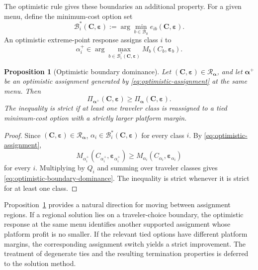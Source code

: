 \documentclass{article}
\newtheorem{proposition}{Proposition}
\begin{document}
The optimistic rule gives these boundaries an additional property.
For a given menu, define the minimum-cost option set
\begin{equation}
    \mathcal B_i^*(\bm C,\bm\varepsilon)
    :=
    \arg\min_{b\in\mathcal B_0}
    e_{ib}(\bm C,\bm\varepsilon).
    \label{eq:minimum-cost-option-set}
\end{equation}
An optimistic extreme-point response assigns class $i$ to
\begin{equation}
    \alpha_i^+
    \in
    \arg\max_{b\in\mathcal B_i^*(\bm C,\bm\varepsilon)}
    M_b(C_b,\bm\varepsilon_b).
    \label{eq:optimistic-assignment}
\end{equation}

\begin{proposition}[Optimistic boundary dominance]
Let $(\bm C,\bm\varepsilon)\in\mathcal R_{\bm\alpha}$, and let
$\bm\alpha^+$ be an optimistic assignment generated by
\eqref{eq:optimistic-assignment} at the same menu. Then
\begin{equation}
    \Pi_{\bm\alpha^+}(\bm C,\bm\varepsilon)
    \geq
    \Pi_{\bm\alpha}(\bm C,\bm\varepsilon).
    \label{eq:optimistic-boundary-dominance}
\end{equation}
The inequality is strict if at least one traveler class is reassigned
to a tied minimum-cost option with a strictly larger platform margin.
\label{prop:optimistic-boundary-dominance}
\end{proposition}

\begin{proof}
Since $(\bm C,\bm\varepsilon)\in\mathcal R_{\bm\alpha}$,
$\alpha_i\in\mathcal B_i^*(\bm C,\bm\varepsilon)$ for every class
$i$. By \eqref{eq:optimistic-assignment},
\begin{equation}
    M_{\alpha_i^+}
    (C_{\alpha_i^+},\bm\varepsilon_{\alpha_i^+})
    \geq
    M_{\alpha_i}
    (C_{\alpha_i},\bm\varepsilon_{\alpha_i})
\end{equation}
for every $i$. Multiplying by $Q_i$ and summing over traveler classes
gives \eqref{eq:optimistic-boundary-dominance}. The inequality is
strict whenever it is strict for at least one class.
\end{proof}

Proposition~\ref{prop:optimistic-boundary-dominance} provides a natural
direction for moving between assignment regions. If a regional solution
lies on a traveler-choice boundary, the optimistic response at the same
menu identifies another supported assignment whose platform profit is
no smaller. If the relevant tied options have different platform
margins, the corresponding assignment switch yields a strict
improvement. The treatment of degenerate ties and the resulting
termination properties is deferred to the solution method.
\end{document}
